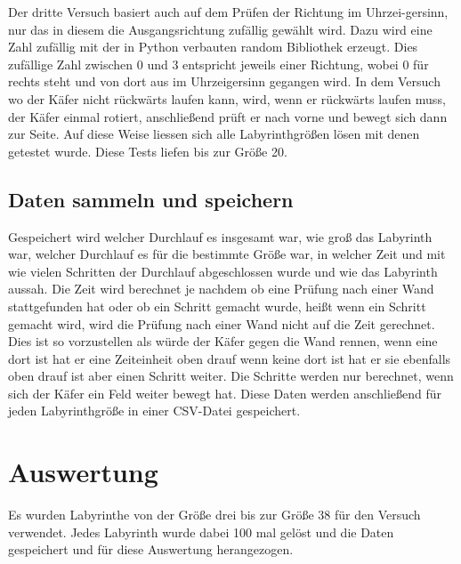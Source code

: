 \documentclass[12pt, a4paper, titlepage]{article}
\begin{document}
Der dritte Versuch basiert auch auf dem Prüfen der Richtung im Uhrzei-gersinn, nur das in diesem die Ausgangsrichtung zufällig gewählt wird.
Dazu wird eine Zahl zufällig mit der in Python verbauten random Bibliothek erzeugt.
Dies zufällige Zahl zwischen 0 und 3 entspricht jeweils einer Richtung, wobei 0 für rechts steht und von dort aus im Uhrzeigersinn gegangen wird.
In dem Versuch wo der Käfer nicht rückwärts laufen kann, wird, wenn er rückwärts laufen muss, der Käfer einmal rotiert, anschließend prüft er nach vorne und bewegt sich dann zur Seite.
Auf diese Weise liessen sich alle Labyrinthgrößen lösen mit denen getestet wurde.
Diese Tests liefen bis zur Größe 20.

\subsection{Daten sammeln und speichern}

Gespeichert wird welcher Durchlauf es insgesamt war, wie groß das Labyrinth war, welcher Durchlauf es für die bestimmte Größe war, in welcher Zeit und mit wie vielen Schritten der Durchlauf abgeschlossen wurde und wie das Labyrinth aussah.
Die Zeit wird berechnet je nachdem ob eine Prüfung nach einer Wand stattgefunden hat oder ob ein Schritt gemacht wurde, heißt wenn ein Schritt gemacht wird, wird die Prüfung nach einer Wand nicht auf die Zeit gerechnet.
Dies ist so vorzustellen als würde der Käfer gegen die Wand rennen, wenn eine dort ist hat er eine Zeiteinheit oben drauf wenn keine dort ist hat er sie ebenfalls oben drauf ist aber einen Schritt weiter.
Die Schritte werden nur berechnet, wenn sich der Käfer ein Feld weiter bewegt hat.
Diese Daten werden anschließend für jeden Labyrinthgröße in einer CSV-Datei gespeichert.

\section{Auswertung}

Es wurden Labyrinthe von der Größe drei bis zur Größe 38 für den Versuch verwendet.
Jedes Labyrinth wurde dabei 100 mal gelöst und die Daten gespeichert und für diese Auswertung herangezogen.

\bigskip
\end{document}
